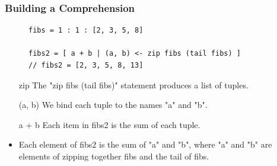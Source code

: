 \documentclass{beamer}
\begin{document}
\begin{frame}[fragile=singleslide]
{
        }
    \end{frame}

    \begin{frame}[fragile=singleslide]
        \frametitle{Building a Comprehension}

        \begin{figure}
            \begin{lstlisting}
fibs = 1 : 1 : [2, 3, 5, 8]

fibs2 = [ a + b | (a, b) <- zip fibs (tail fibs) ]
// fibs2 = [2, 3, 5, 8, 13]
            \end{lstlisting}
        \end{figure}

        \begin{itemize}
            \item[zip] The "zip fibs (tail fibs)" statement produces a list of tuples.
            \item[(a, b)] We bind each tuple to the names "a" and "b".
            \item[a + b] Each item in fibs2 is the sum of each tuple.
            \item Each element of fibs2 is the sum of "a" and "b", where "a" and "b" are elements of zipping together fibs and the tail of fibs.
        \end{itemize}
    \end{frame}
\end{document}
